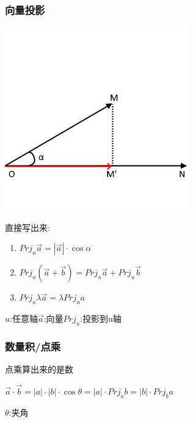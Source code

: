 \documentclass[UTF8,12pt]{ctexbook}
\newcommand{\projection}[1]{Prj_{#1}}
\begin{document}
{{{{    }%

    \subsubsection{向量投影}{
      \begin{center}
        \includegraphics{resources/vector_axis_projection.png}
      \end{center}

      直接写出来:
      \begin{enumerate}
        \item $\projection{u}\vec{a} = |\vec{a}|\cdot\cos\alpha$
        \item $\projection{u}(\vec{a} + \vec{b}) = \projection{u}\vec{a} + \projection{u}\vec{b}$
        \item $\projection{u}\lambda\vec{a} = \lambda\projection{u}a$
      \end{enumerate}

      $u$:任意轴\qquad$\vec{a}$:向量\qquad$\projection{u}$:投影到u轴

    }%

    \subsubsection{数量积/点乘}{
      点乘算出来的是数

      $\vec{a} \cdot \vec{b} = |a|\cdot|b|\cdot\cos\theta = |a|\cdot\projection{a}b = |b|\cdot\projection{b}a$

      $\theta$:夹角\\

}}}}
\end{document}

